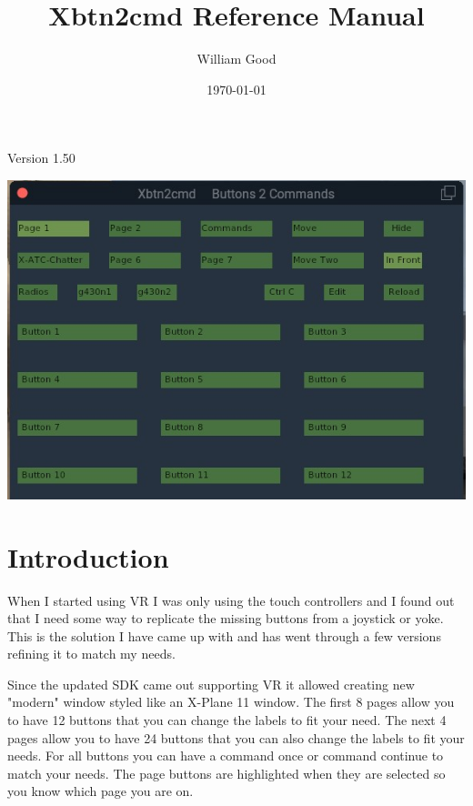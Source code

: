 \documentclass[11pt,parskip=half,a4paper]{scrartcl}
\begin{document}
\title{Xbtn2cmd Reference Manual}
\author{William Good}
\date{\today}
\maketitle

\begin{center}
Version 1.50
\end{center}

\begin{center}
\includegraphics[width=15cm]{../pics/Xbtn2cmd_Page1.jpg}
\end{center}



\thispagestyle{empty}
\newpage
\verb||
\tableofcontents

\newpage
\section{Introduction}

When I started using VR I was only using the touch controllers and I found out that I need some way to replicate the missing buttons from a joystick or yoke. This is the solution I have came up with and has went through a few versions refining it to match my needs. \newline

Since the updated SDK came out supporting VR it allowed creating new "modern" window styled like an X-Plane 11 window. The first 8 pages allow you to have 12 buttons that you can change the labels to fit your need. The next 4 pages allow you to have 24 buttons that you can also change the labels to fit your needs. For all buttons you can have a command once or command continue to match your needs. The page buttons are highlighted when they are selected so you know which page you are on. 
\end{document}
